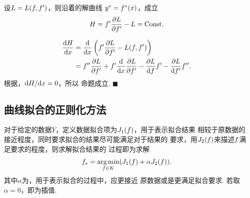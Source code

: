   \begin{thm}[守恒律定理]
    \label{thm: 守恒律定理}
    设$L = L(\mathnormal{f},\mathnormal{f}^\prime)$，则沿着的解曲线
    $y^* = \mathnormal{f}^*(x)$，成立
    \[
      H = \mathnormal{f}^\prime\frac{\partial L}{\partial\mathnormal{f}^\prime} - L = \text{Const}.
    \]
  \end{thm}
  \proof
    \[\begin{split}
     \frac{\mathrm{d} H}{\mathrm{d} x} &= \frac{\mathrm{d}}{\mathrm{d} x}
     \left( \mathnormal{f}^\prime\frac{\partial L}{\partial\mathnormal{f}^\prime}-L(\mathnormal{f},\mathnormal{f}^\prime) \right)\\
     &= \mathnormal{f}^{\prime\prime}\frac{\partial L}{\partial\mathnormal{f}^\prime}
     + \mathnormal{f}^\prime\frac{\mathrm{d}}{\mathrm{d} x}\frac{\partial L}{\partial\mathnormal{f}^\prime} -
     \frac{\partial L}{\mathrm{d}\mathnormal{f}}\mathnormal{f}^\prime -
     \frac{\partial L}{\mathrm{d}\mathnormal{f}^\prime}\mathnormal{f}^{\prime\prime}.
    \end{split}\]
    根据，$\mathrm{d} H /\mathrm{d} x =0$，所以
    命题成立. $\blacksquare$


\newpage
\subsection{曲线拟合的正则化方法}
  \begin{defi}[Tikhonov正则化]
    \label{def: Tikhonov正则化}
    对于给定的数据$Y$，定义数据拟合项为$J_1(\mathnormal{f})$，用于表示拟合结果
    相较于原数据的接近程度，同时要求拟合的结果尽可能满足对于结果的
    要求，用$J_2(\mathnormal{f})$来描述$\mathnormal{f}$满足要求的程度，则求解拟合结果的
    过程即为求解
    \[
      \mathnormal{f}_* = \operatorname*{arg\,min}_{\mathnormal{f}\in K}(J_1(\mathnormal{f}) + \alpha J_2(\mathnormal{f})).
    \]
    其中$\alpha$为，用于表示拟合的过程中，应更接近
    原数据或是更满足拟合要求. 若取$\alpha=0$，即为插值.
  \end{defi}

